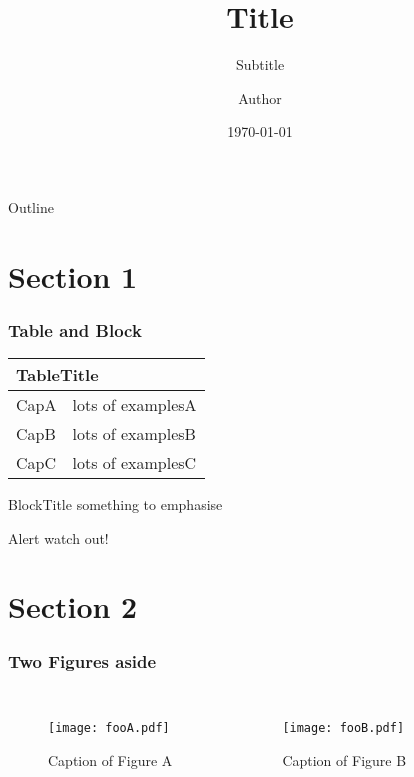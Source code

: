 \documentclass[handout]{beamer}
\title{Title}
\subtitle{Subtitle}
\author{Author}
\date{\today}
\begin{document}
 
\begin{frame}
\titlepage
\end{frame}

\begin{frame}{Outline}
    \tableofcontents
\end{frame}

\section{Section 1}

\begin{frame}
	\frametitle{Table and Block}
	\begin{table}[h]
		\centering
		\begin{tabular}{p{} p{}} 
			\toprule
			\multicolumn{2}{p{0.9\textwidth}}{TableTitle} \\
			\midrule
			CapA       & lots of examplesA \\

			CapB       & lots of examplesB \\
			
			CapC       & lots of examplesC \\
			\bottomrule
		\end{tabular} 
	\end{table}

	\begin{block}{BlockTitle}
		something to emphasise
	\end{block}
	
	\begin{alertblock}{Alert}
	    watch out!
	\end{alertblock}
\end{frame}

\section{Section 2}

\begin{frame}
	\frametitle{Two Figures aside}
	\begin{columns}[b]
			\centering
			\begin{figure}
				\texttt{[image: fooA.pdf]} \
				\caption{Caption of Figure A}
			\end{figure}
			\centering
			\begin{figure}
				\texttt{[image: fooB.pdf]} \
				\caption{Caption of Figure B}
			\end{figure}
	\end{columns}
\end{frame}
\end{document}
